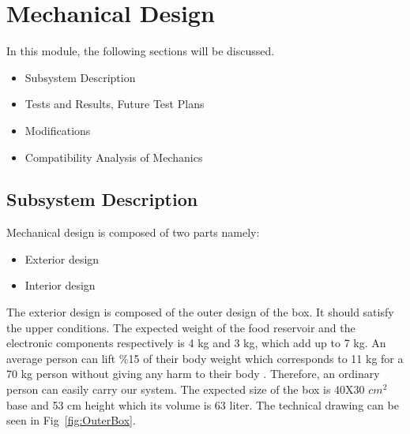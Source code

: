 \section{Mechanical Design}
\label{sec:mechanical_design}
In this module, the following sections will be discussed.
\begin{itemize}
    \item Subsystem Description
    \item Tests and Results, Future Test Plans
    \item Modifications
    \item Compatibility Analysis of Mechanics
\end{itemize}

\subsection{Subsystem Description}

Mechanical design is composed of two parts namely:
\begin{itemize}
    \item Exterior design
    \item Interior design
\end{itemize}

The exterior design is composed of the outer design of the box. It should satisfy the upper conditions. The expected weight of the food reservoir and the electronic components respectively is 4 kg and 3 kg, which add up to 7 kg. An average person can lift \%15 of their body weight which corresponds to 11 kg for a 70 kg person without giving any harm to their body \cite{cite:CWH}. Therefore, an ordinary person can easily carry our system. 
The expected size of the box is 40X30 $cm^{2}$ base and 53 cm height which its volume is 63 liter. The technical drawing can be seen in Fig~\ref{fig:OuterBox}. 

